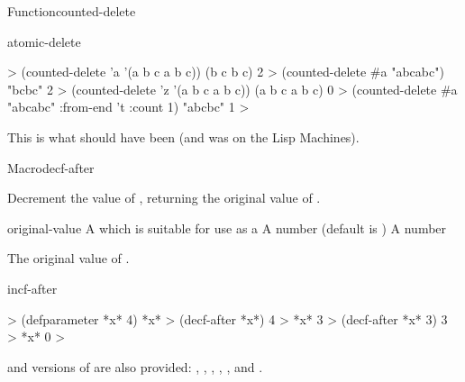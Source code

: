 \documentclass[10pt,twoside,english,pdftex]{article}
\begin{document}
\begin{functiondoc}{Function}{counted-delete}{
    }
\begin{alsos}{atomic-delete}
\also[delq]
\end{alsos}

\fnexamples
\begin{example}
%
\W\supp
  > (counted-delete 'a '(a b c a b c))
  (b c b c)
  2
  > (counted-delete #\bkslash{}a "abcabc")
  "bcbc"
  2\goodpagebreak
  > (counted-delete 'z '(a b c a b c))
  (a b c a b c)
  0
  > (counted-delete #\bkslash{}a "abcabc" :from-end 't :count 1)
  "abcbc"
  1
  >
\end{example}

\fnnote This is what  should have been (and was on the
Lisp Machines).

\end{functiondoc}


\begin{functiondoc}{Macro}{decf-after}{
    }
%

\fnsyntax

\fnpurpose Decrement the value of , returning the original value of
.

\fnpackage {}

\fnmodule {}

\fnargs
\begin{args}{original-value}
\arg[place] A  which is suitable for use as a 
\arg[decrement] A number (default is )
 A number
\end{args}

\fnreturns The original value of .

\begin{alsos}{incf-after}
\end{alsos}

\fnexamples
\begin{example}
%
\W\supp
  > (defparameter *x* 4)
  *x*
  > (decf-after *x*)
  4 
  > *x*
  3
  > (decf-after *x* 3)
  3
  > *x*
  0
  >
\end{example}

\fnnote
%
%
%
%
%
%
%
%
 and  versions of  are also
provided: , ,
, ,
, and .

\end{functiondoc}
\end{document}
